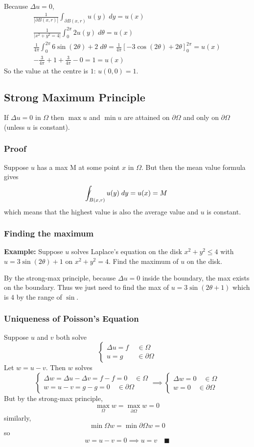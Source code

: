 \documentclass[10pt]{article}
\begin{document}
Because $\Delta u = 0$, 
\begin{gather*}
    \frac{1}{|\partial B(x, r)|}\int_{\partial B(x, r)} u(y)\; dy = u(x)\\
    \frac{1}{|x^2 + y^2 = 4|}\int_0^{2\pi} 2u(y)\; d\theta = u(x)\\
    \frac{1}{4\pi} \int_0^{2\pi} 6\sin(2\theta) + 2\; d\theta = \frac{1}{4\pi}[-3\cos(2\theta) +2\theta]_0^{2\pi} = u(x)\\
    -\frac{3}{4\pi} + 1 + \frac{3}{4\pi} - 0 = 1 = u(x)
\end{gather*}
So the value at the centre is $1$: $u(0, 0)=1$.

\subsection{Strong Maximum Principle}
If $\Delta u =0$ in $\Omega$ then $\max u$ and $\min u$ are attained on $\partial \Omega$ and only on $\partial \Omega$ (unless $u$ is constant).

\subsubsection{Proof} 
Suppose $u$ has a max M at some point $x$ in $\Omega$. But then the mean value formula gives 
\[\not \!\!\!\int_{B(x, r)} u(y)\; dy = u(x) = M\]
which means that the highest value is also the average value and $u$ is constant. 

\subsubsection{Finding the maximum}
\textbf{Example:} Suppose $u$ solves Laplace's equation on the disk $x^2 + y^2 \leq 4$ with $u = 3\sin(2\theta) + 1$ on $x^2 + y^2 = 4$. Find the maximum of $u$ on the disk. 

By the strong-max principle, because $\Delta u= 0$ inside the boundary, the max exists on the boundary. Thus we just need to find the max of $u = 3\sin(2\theta + 1)$ which is $4$ by the range of $\sin$. 

\subsubsection{Uniqueness of Poisson's Equation}
Suppose $u$ and $v$ both solve 
\[\begin{cases}
    \Delta u = f \quad\, \in \Omega\\
    u = g \qquad \in \partial \Omega
\end{cases}\]
Let $w = u - v$. Then $w$ solves 
\[\begin{cases}
    \Delta w = \Delta u - \Delta v= f - f = 0 \quad \in \Omega\\
    w = u - v = g - g = 0 \quad \in \partial \Omega 
\end{cases} \implies \begin{cases}
    \Delta w = 0\quad \in \Omega\\
    w = 0 \quad \in \partial \Omega
\end{cases}\]
But by the strong-max principle, 
\[\max_{\Omega} w = \max_{\partial \Omega} w = 0\]
similarly, 
\[\min{\Omega} w = \min{\partial \Omega} w = 0\]
so 
\[w = u - v = 0 \implies u = v \quad \blacksquare\]
\end{document}
